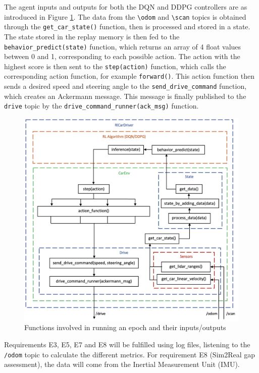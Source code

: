 The agent inputs and outputs for both the DQN and DDPG controllers are as introduced in Figure \ref{inputs_outputs}. The data from the \verb|\odom| and \verb|\scan| topics is obtained through the \verb|get_car_state()| function, then is processed and stored in a state. The state stored in the replay memory is then fed to the \verb|behavior_predict(state)| function, which returns an array of 4 float values between 0 and 1, corresponding to each possible action. The action with the highest score is then sent to the \verb|step(action)| function, which calls the corresponding action function, for example \verb|forward()|. This action function then sends a desired speed and steering angle to the \verb|send_drive_command| function, which creates an Ackermann message. This message is finally published to the \verb|drive| topic by the \verb|drive_command_runner(ack_msg)| function.

\begin{figure}
\centering
\includegraphics[scale=0.6]{Figures/inputs_outputs.png}
\caption{Functions involved in running an epoch and their inputs/outputs}
\label{inputs_outputs}
\end{figure}



Requirements E3, E5, E7 and E8 will be fulfilled using log files, listening to the \verb |/odom| topic to calculate the different metrics. For requirement E8 (Sim2Real gap assessment), the data will come from the Inertial Measurement Unit (IMU). \\

